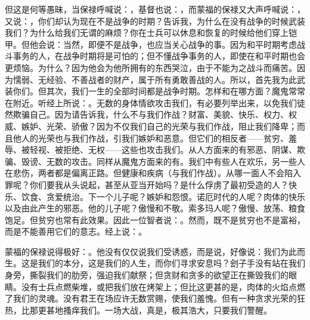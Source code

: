 但这是何等愚昧，当保禄呼喊说：，基督也说：，而蒙福的保禄又大声呼喊说：，又说：，你们却认为现在不是战争的时期？告诉我，为什么在没有战争的时候武装我们？为什么给我们无谓的麻烦？你在士兵可以休息和恢复的时候给他们穿上铠甲。但他会说：当然，即便不是战争，也应当关心战争的事。因为和平时期考虑战斗事务的人，在战争时期将是可怕的；但不懂战争事务的人，即使在和平时期也会更烦恼。为什么？因为他会为他所拥有的东西哭泣，由于不能为之战斗而痛苦。因为懦弱、无经验、不善战者的财产，属于所有勇敢善战的人。所以，首先我为此武装你们。但其次，我们一生的全部时间都是战争时期。怎样和在哪方面？魔鬼常常在附近。听经上所说：。无数的身体情欲攻击我们，有必要列举出来，以免我们徒然欺骗自己。因为请告诉我，什么不与我们作战？财富、美貌、快乐、权力、权威、嫉妒、光荣、骄傲？因为不仅我们自己的光荣与我们作战，阻止我们降卑；而且他人的光荣也与我们作战，引我们嫉妒和恶意。但它们的相反者——贫穷、羞辱、被轻视、被拒绝、无权——这些也攻击我们。从人方面来的有邪恶、阴谋、欺骗、毁谤、无数的攻击。同样从魔鬼方面来的有。我们中有些人在欢乐，另一些人在悲伤，两者都是偏离正路。但健康和疾病（与我们作战）。从哪一面人不会陷入罪呢？你们要我从头说起，甚至从亚当开始吗？是什么俘虏了最初受造的人？快乐、饮食、贪爱统治。下一个儿子呢？嫉妒和怨恨。诺厄时代的人呢？肉体的快乐以及由此产生的邪恶。他的儿子呢？傲慢和不敬。索多玛人呢？傲慢、放荡、粮食饱足。但贫穷也常有此效果。因此一位智者说：。然而，既不是贫穷也不是富裕，而是不能善用它们的意志。经上说：。\par

蒙福的保禄说得极好：。他没有仅仅说我们受诱惑，而是说，好像说：我们为此而生。这是我们的本分，这是我们的人生，而你们寻求安息吗？刽子手没有站在我们身旁，撕裂我们的肋旁，强迫我们献祭；但贪财和贪多的欲望正在撕毁我们的眼睛。没有士兵点燃柴堆，或把我们放在烤架上；但比这更甚的是，肉体的火焰点燃了我们的灵魂。没有君王在场应许无数赏赐，使我们羞愧。但有一种贪求光荣的狂热，比那更甚地搔痒我们。一场大战，真是，极其浩大，只要我们警醒。\par

